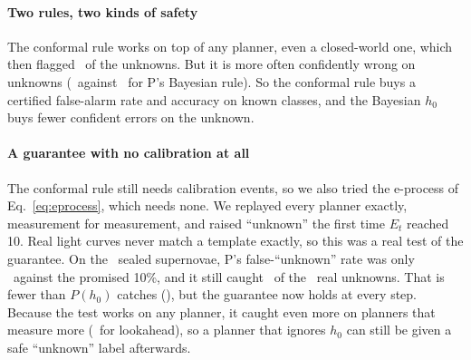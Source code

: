 \paragraph{Two rules, two kinds of safety} The conformal rule works on top of any planner, even a closed-world one, which then flagged \ConfFlagBthreeConf\ of the unknowns. But it is more often confidently wrong on unknowns (\ConfCwUnkCL\ against \ConfCwUnkP\ for P's Bayesian rule). So the conformal rule buys a certified false-alarm rate and accuracy on known classes, and the Bayesian $h_0$ buys fewer confident errors on the unknown.

\paragraph{A guarantee with no calibration at all} The conformal rule still needs calibration events, so we also tried the e-process of Eq.~\eqref{eq:eprocess}, which needs none. We replayed every planner exactly, measurement for measurement, and raised ``unknown'' the first time $E_t$ reached 10. Real light curves never match a template exactly, so this was a real test of the guarantee. On the \EFreshN\ sealed supernovae, P's false-``unknown'' rate was only \EFreshFa\ against the promised 10\%, and it still caught \EDet\ of the \EWithheldN\ real unknowns. That is fewer than $P(h_0)$ catches (\RealCFlagP), but the guarantee now holds at every step. Because the test works on any planner, it caught even more on planners that measure more (\EDetL\ for lookahead), so a planner that ignores $h_0$ can still be given a safe ``unknown'' label afterwards.
